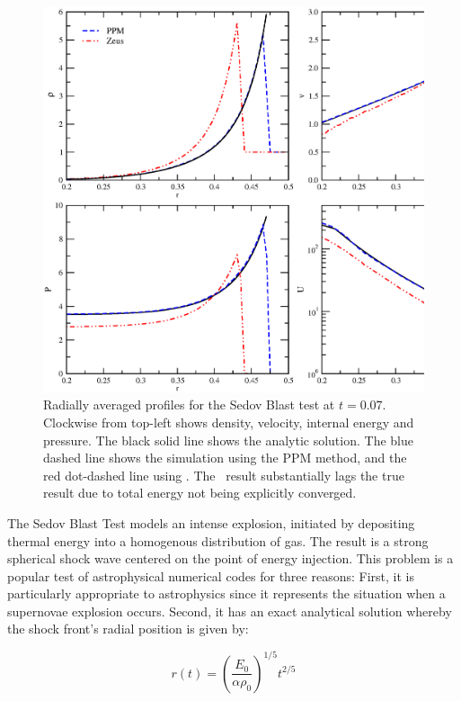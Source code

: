 \begin{figure}
\begin{center}
\includegraphics[width=\textwidth]{figures/sedov-profiles.eps}
\caption{Radially averaged profiles for the Sedov Blast test at $t =
0.07$. Clockwise from top-left shows density, velocity, internal
energy and pressure.  The black solid line shows the analytic
solution.  The blue dashed line shows the simulation using the PPM
method, and the red dot-dashed line using \zeus.  The \zeus\ result
substantially lags the true result due to total energy not being
explicitly converged.}
\label{fig.sedov2}
\end{center}
\end{figure}

The Sedov Blast Test \citep{Sedov1959} models an intense explosion,
initiated by depositing thermal energy into a homogenous distribution
of gas. The result is a strong spherical shock wave centered on the
point of energy injection.  This problem is a popular test of
astrophysical numerical codes for three reasons: First, it is
particularly appropriate to astrophysics since it represents the
situation when a supernovae explosion occurs. Second, it has an
exact analytical solution whereby the shock front's radial position is
given by:

\begin{equation} r(t) =
\left(\frac{E_0}{\alpha\rho_0}\right)^{1/5}t^{2/5}
\end{equation}

